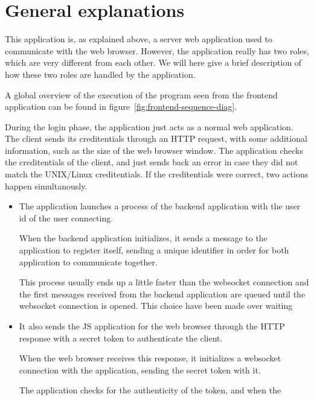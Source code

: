 \section{General explanations}
% 
This application is, as explained above, a server web application used to 
communicate with the web browser. However, the application really has two 
roles, which are very different from each other. We will here give a brief 
description of how these two roles are handled by the application.

A global overview of the execution of the program seen from the frontend 
application can be found in figure~\ref{fig:frontend-sequence-diag}.


During the login phase, the application just acts as a normal web 
application. The client sends its creditentials through an HTTP request,
with some additional information, such as the size of the web browser 
window. The application checks the creditentials of the client, and 
just sends back an error in case they did not match the UNIX/Linux 
creditentials. If the creditentials were correct, two actions happen 
simultanously. 
\begin{itemize}
\item The application launches a process of the backend 
  application with the user id of the user connecting.
  
  When the backend application initializes, it sends a message to 
  the application to register itself, sending a unique identifier 
  in order for both application to communicate together. 

  This process usually ends up a little faster than the websocket connection and 
  the first messages received from the backend application are queued until 
  the websocket connection is opened. This choice have been made over waiting 
\item It also sends the JS application for the web browser through the HTTP 
  response with a secret token to authenticate the client. 
  
  When the web browser receives this response, it initializes a websocket 
  connection with the application, sending the secret token with it. 

  The application checks for the authenticity of the token, and when the 
\end{itemize}
